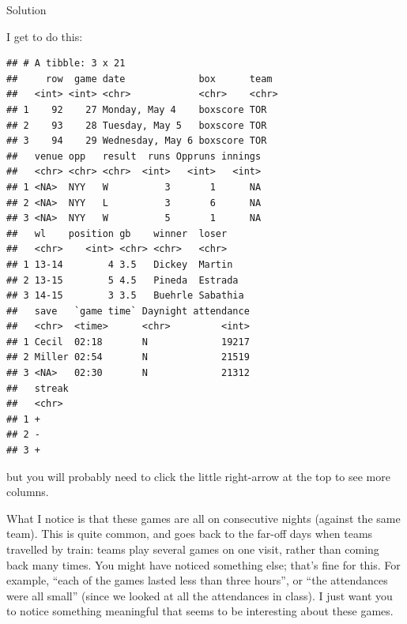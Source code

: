 \documentclass[]{tufte-book}
\newenvironment{Shaded}{}{}
\newcommand{\DataTypeTok}[1]{\textcolor[rgb]{0.56,0.13,0.00}{#1}}
\newcommand{\KeywordTok}[1]{\textcolor[rgb]{0.00,0.44,0.13}{\textbf{#1}}}
\newcommand{\NormalTok}[1]{#1}
\newcommand{\OperatorTok}[1]{\textcolor[rgb]{0.40,0.40,0.40}{#1}}
\newcommand{\OtherTok}[1]{\textcolor[rgb]{0.00,0.44,0.13}{#1}}
\newcommand{\StringTok}[1]{\textcolor[rgb]{0.25,0.44,0.63}{#1}}
\theoremstyle{definition}
\theoremstyle{definition}
\theoremstyle{definition}
\theoremstyle{remark}
\begin{document}
Solution

I get to do this:

\begin{Shaded}
\end{Shaded}

\begin{verbatim}
## # A tibble: 3 x 21
##     row  game date             box      team 
##   <int> <int> <chr>            <chr>    <chr>
## 1    92    27 Monday, May 4    boxscore TOR  
## 2    93    28 Tuesday, May 5   boxscore TOR  
## 3    94    29 Wednesday, May 6 boxscore TOR  
##   venue opp   result  runs Oppruns innings
##   <chr> <chr> <chr>  <int>   <int>   <int>
## 1 <NA>  NYY   W          3       1      NA
## 2 <NA>  NYY   L          3       6      NA
## 3 <NA>  NYY   W          5       1      NA
##   wl    position gb    winner  loser   
##   <chr>    <int> <chr> <chr>   <chr>   
## 1 13-14        4 3.5   Dickey  Martin  
## 2 13-15        5 4.5   Pineda  Estrada 
## 3 14-15        3 3.5   Buehrle Sabathia
##   save   `game time` Daynight attendance
##   <chr>  <time>      <chr>         <int>
## 1 Cecil  02:18       N             19217
## 2 Miller 02:54       N             21519
## 3 <NA>   02:30       N             21312
##   streak
##   <chr> 
## 1 +     
## 2 -     
## 3 +
\end{verbatim}

but you will probably need to click the little right-arrow at the top to
see more columns.

What I notice is that these games are all on consecutive nights (against
the same team). This is quite common, and goes back to the far-off days
when teams travelled by train: teams play several games on one visit,
rather than coming back many times.
You might have noticed something else; that's fine for this. For
example, ``each of the games lasted less than three hours'', or ``the
attendances were all small'' (since we looked at all the attendances in
class). I just want you to notice something meaningful that seems to be
interesting about these games.
\end{document}
